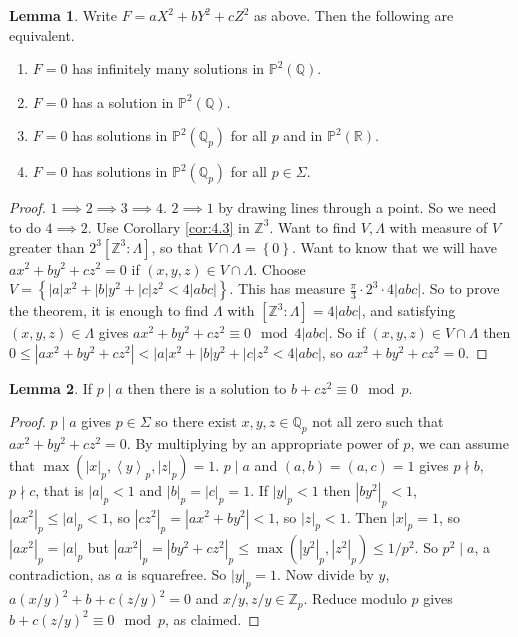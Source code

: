 \documentclass{article}
\newcommand{\Z}{\mathbb{Z}}
\newcommand{\Q}{\mathbb{Q}}
\newcommand{\R}{\mathbb{R}}
\renewcommand{\P}{\mathbb{P}}
\newcommand{\rb}[1]{\left( #1 \right)}
\renewcommand{\sb}[1]{\left[ #1 \right]}
\newcommand{\cb}[1]{\left\{ #1 \right\}}
\newcommand{\ab}[1]{\left\langle #1 \right\rangle}
\newcommand{\abs}[1]{\left\lvert #1 \right\rvert}
\theoremstyle{definition}\newtheorem{definition}{Definition}[section]
\theoremstyle{definition}\newtheorem{remark}[definition]{Remark}
\theoremstyle{definition}\newtheorem*{example}{Example}
\theoremstyle{definition}\newtheorem*{note}{Note}
\newtheorem{lemma}[definition]{Lemma}
\begin{document}
\begin{lemma}
Write $ F = aX^2 + bY^2 + cZ^2 $ as above. Then the following are equivalent.
\begin{enumerate}
\item $ F = 0 $ has infinitely many solutions in $ \P^2\rb{\Q} $.
\item $ F = 0 $ has a solution in $ \P^2\rb{\Q} $.
\item $ F = 0 $ has solutions in $ \P^2\rb{\Q_p} $ for all $ p $ and in $ \P^2\rb{\R} $.
\item $ F = 0 $ has solutions in $ \P^2\rb{\Q_p} $ for all $ p \in \Sigma $.
\end{enumerate}
\end{lemma}

\begin{proof}
$ 1 \implies 2 \implies 3 \implies 4 $. $ 2 \implies 1 $ by drawing lines through a point. So we need to do $ 4 \implies 2 $. Use Corollary \ref{cor:4.3} in $ \Z^3 $. Want to find $ V, \Lambda $ with measure of $ V $ greater than $ 2^3\sb{\Z^3 : \Lambda} $, so that $ V \cap \Lambda = \cb{0} $. Want to know that we will have $ ax^2 + by^2 + cz^2 = 0 $ if $ \rb{x, y, z} \in V \cap \Lambda $. Choose $ V = \cb{\abs{a}x^2 + \abs{b}y^2 + \abs{c}z^2 < 4\abs{abc}} $. This has measure $ \tfrac{\pi}{3} \cdot 2^3 \cdot 4\abs{abc} $. So to prove the theorem, it is enough to find $ \Lambda $ with $ \sb{\Z^3 : \Lambda} = 4\abs{abc} $, and satisfying $ \rb{x, y, z} \in \Lambda $ gives $ ax^2 + by^2 + cz^2 \equiv 0 \mod 4\abs{abc} $. So if $ \rb{x, y, z} \in V \cap \Lambda $ then $ 0 \le \abs{ax^2 + by^2 + cz^2} < \abs{a}x^2 + \abs{b}y^2 + \abs{c}z^2 < 4\abs{abc} $, so $ ax^2 + by^2 + cz^2 = 0 $.
\end{proof}


\begin{lemma}
If $ p \mid a $ then there is a solution to $ b + cz^2 \equiv 0 \mod p $.
\end{lemma}

\begin{proof}
$ p \mid a $ gives $ p \in \Sigma $ so there exist $ x, y, z \in \Q_p $ not all zero such that $ ax^2 + by^2 + cz^2 = 0 $. By multiplying by an appropriate power of $ p $, we can assume that $ \max\rb{\abs{x}_p, \ab{y}_p, \abs{z}_p} = 1 $. $ p \mid a $ and $ \rb{a, b} = \rb{a, c} = 1 $ gives $ p \nmid b $, $ p \nmid c $, that is $ \abs{a}_p < 1 $ and $ \abs{b}_p = \abs{c}_p = 1 $. If $ \abs{y}_p < 1 $ then $ \abs{by^2}_p < 1 $, $ \abs{ax^2}_p \le \abs{a}_p < 1 $, so $ \abs{cz^2}_p = \abs{ax^2 + by^2} < 1 $, so $ \abs{z}_p < 1 $. Then $ \abs{x}_p = 1 $, so $ \abs{ax^2}_p = \abs{a}_p $ but $ \abs{ax^2}_p = \abs{by^2 + cz^2}_p \le \max\rb{\abs{y^2}_p, \abs{z^2}_p} \le 1 / p^2 $. So $ p^2 \mid a $, a contradiction, as $ a $ is squarefree. So $ \abs{y}_p = 1 $. Now divide by $ y $, $ a\rb{x / y}^2 + b + c\rb{z / y}^2 = 0 $ and $ x / y, z / y \in \Z_p $. Reduce modulo $ p $ gives $ b + c\rb{z / y}^2 \equiv 0 \mod p $, as claimed.
\end{proof}
\end{document}
